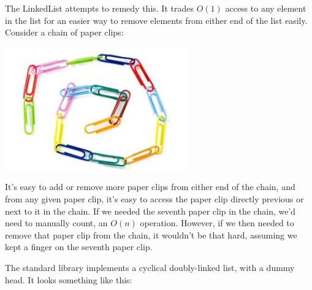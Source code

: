 \documentclass[11pt]{book}
\begin{document}
The LinkedList attempts to remedy this. It trades $O(1)$ access to any element in the list for an easier way to remove elements from either end of the list easily. Consider a chain of paper clips:

\begin{center}

\includegraphics{paper_clip_chain.jpg}

\end{center}

It's easy to add or remove more paper clips from either end of the chain, and from any given paper clip, it's easy to access the paper clip directly previous or next to it in the chain. If we needed the seventh paper clip in the chain, we'd need to manually count, an $O(n)$ operation. However, if we then needed to remove that paper clip from the chain, it wouldn't be that hard, assuming we kept a finger on the seventh paper clip.

The standard library implements a cyclical doubly-linked list, with a dummy head. It looks something like this:
\end{document}
